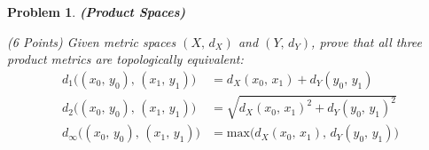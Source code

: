 \documentclass{article}
\theoremstyle{normal}
\newtheorem{problem}{Problem}
\begin{document}
    \newpage
    \color{blue}
    \begin{problem}
        \textbf{(Product Spaces)}
        \par\hfill\par
        (6 Points) Given metric spaces $(X,\,d_{X})$
        and $(Y,\,d_{Y})$, prove that all three product metrics are
        topologically equivalent:
        \begin{align}
            d_{1}\big((x_{0},\,y_{0}),\,(x_{1},\,y_{1})\big)
                &=d_{X}(x_{0},\,x_{1})+d_{Y}(y_{0},\,y_{1})\\
            d_{2}\big((x_{0},\,y_{0}),\,(x_{1},\,y_{1})\big)
                &=\sqrt{d_{X}(x_{0},\,x_{1})^{2}+d_{Y}(y_{0},\,y_{1})^{2}}\\
            d_{\infty}\big((x_{0},\,y_{0}),\,(x_{1},\,y_{1})\big)
                &=\textrm{max}\big(%
                    d_{X}(x_{0},\,x_{1}),\,d_{Y}(y_{0},\,y_{1})
                \big)
        \end{align}
    \end{problem}
    \color{black}
\end{document}
